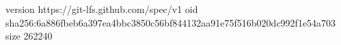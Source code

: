 version https://git-lfs.github.com/spec/v1
oid sha256:6a886fbeb6a397ea4bbc3850c56bf844132aa91e75f516b020dc992f1e54a703
size 262240
